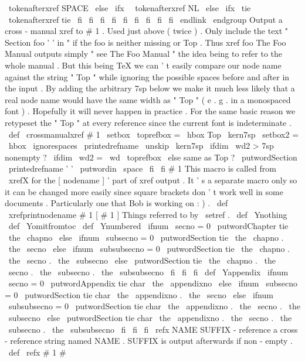 {{{{{\
tokenafterxref
%
SPACE
\
else
\
ifx
\
\
tokenafterxref
%
NL
\
else
\
ifx
\
tie
\
tokenafterxref
%
tie
\
fi
\
fi
\
fi
\
fi
\
fi
\
fi
\
fi
\
fi
\
fi
\
endlink
\
endgroup
}
%
Output
a
cross
-
manual
xref
to
#
1
.
Used
just
above
(
twice
)
.
%
%
Only
include
the
text
"
Section
foo
'
'
in
"
if
the
foo
is
neither
%
missing
or
Top
.
Thus
xref
{
foo
The
Foo
Manual
}
outputs
simply
%
"
see
The
Foo
Manual
"
the
idea
being
to
refer
to
the
whole
manual
.
%
%
But
this
being
TeX
we
can
'
t
easily
compare
our
node
name
against
the
%
string
"
Top
"
while
ignoring
the
possible
spaces
before
and
after
in
%
the
input
.
By
adding
the
arbitrary
7sp
below
we
make
it
much
less
%
likely
that
a
real
node
name
would
have
the
same
width
as
"
Top
"
(
e
.
g
.
%
in
a
monospaced
font
)
.
Hopefully
it
will
never
happen
in
practice
.
%
%
For
the
same
basic
reason
we
retypeset
the
"
Top
"
at
every
%
reference
since
the
current
font
is
indeterminate
.
%
\
def
\
crossmanualxref
#
1
{
%
\
setbox
\
toprefbox
=
\
hbox
{
Top
\
kern7sp
}
%
\
setbox2
=
\
hbox
{
\
ignorespaces
\
printedrefname
\
unskip
\
kern7sp
}
%
\
ifdim
\
wd2
>
7sp
%
nonempty
?
\
ifdim
\
wd2
=
\
wd
\
toprefbox
\
else
%
same
as
Top
?
\
putwordSection
{
}
\
printedrefname
'
'
\
putwordin
{
}
\
space
\
fi
\
fi
#
1
%
}
%
This
macro
is
called
from
\
xrefX
for
the
[
nodename
]
'
part
of
xref
%
output
.
It
'
s
a
separate
macro
only
so
it
can
be
changed
more
easily
%
since
square
brackets
don
'
t
work
well
in
some
documents
.
Particularly
%
one
that
Bob
is
working
on
:
)
.
%
\
def
\
xrefprintnodename
#
1
{
[
#
1
]
}
%
Things
referred
to
by
\
setref
.
%
\
def
\
Ynothing
{
}
\
def
\
Yomitfromtoc
{
}
\
def
\
Ynumbered
{
%
\
ifnum
\
secno
=
0
\
putwordChapter
tie
\
the
\
chapno
\
else
\
ifnum
\
subsecno
=
0
\
putwordSection
tie
\
the
\
chapno
.
\
the
\
secno
\
else
\
ifnum
\
subsubsecno
=
0
\
putwordSection
tie
\
the
\
chapno
.
\
the
\
secno
.
\
the
\
subsecno
\
else
\
putwordSection
tie
\
the
\
chapno
.
\
the
\
secno
.
\
the
\
subsecno
.
\
the
\
subsubsecno
\
fi
\
fi
\
fi
}
\
def
\
Yappendix
{
%
\
ifnum
\
secno
=
0
\
putwordAppendix
tie
char
\
the
\
appendixno
{
}
%
\
else
\
ifnum
\
subsecno
=
0
\
putwordSection
tie
char
\
the
\
appendixno
.
\
the
\
secno
\
else
\
ifnum
\
subsubsecno
=
0
\
putwordSection
tie
char
\
the
\
appendixno
.
\
the
\
secno
.
\
the
\
subsecno
\
else
\
putwordSection
tie
char
\
the
\
appendixno
.
\
the
\
secno
.
\
the
\
subsecno
.
\
the
\
subsubsecno
\
fi
\
fi
\
fi
}
%
\
refx
{
NAME
}
{
SUFFIX
}
-
reference
a
cross
-
reference
string
named
NAME
.
SUFFIX
%
is
output
afterwards
if
non
-
empty
.
\
def
\
refx
#
1
#
}}}}
